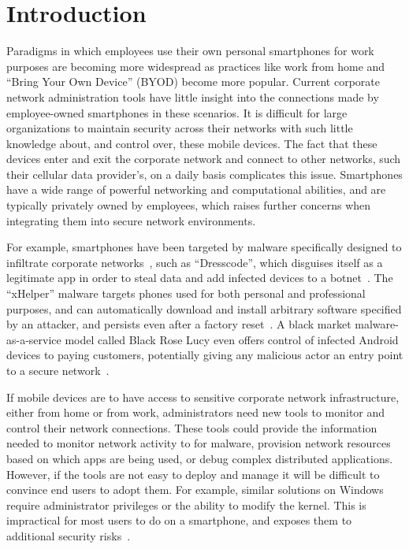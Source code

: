 \section{Introduction}
\label{sec:introduction}


Paradigms in which employees use their own personal smartphones for work
purposes are becoming more widespread as practices like work from home and
``Bring Your Own Device'' (BYOD) become more popular. Current corporate network
administration tools have little insight into the connections made by
employee-owned smartphones in these scenarios. It is difficult for large
organizations to maintain security across their networks with such little
knowledge about, and control over, these mobile devices. The fact that these
devices enter and exit the corporate network and connect to other networks, such
their cellular data provider's, on a daily basis complicates this issue.
Smartphones have a wide range of powerful networking and computational
abilities, and are typically privately owned by employees, which raises further
concerns when integrating them into secure network environments.

For example, smartphones have been targeted by malware specifically designed to
infiltrate corporate networks~\cite{kan2016}, such as ``Dresscode'', which
disguises itself as a legitimate app in order to steal data and add infected
devices to a botnet~\cite{palmer2016}. The ``xHelper'' malware targets phones
used for both personal and professional purposes, and can automatically download
and install arbitrary software specified by an attacker, and persists even after
a factory reset~\cite{vijayan2020}. A black market malware-as-a-service model
called Black Rose Lucy even offers control of infected Android devices to paying
customers, potentially giving any malicious actor an entry point to a secure
network~\cite{wong2018}.

If mobile devices are to have access to sensitive corporate network
infrastructure, either from home or from work, administrators need new tools to
monitor and control their network connections. These tools could provide the
information needed to monitor network activity to for malware, provision network
resources based on which apps are being used, or debug complex distributed
applications. However, if the tools are not easy to deploy and manage it will be
difficult to convince end users to adopt them.  For example, similar solutions
on Windows~\cite{chuluundorj2019, kwon2011} require administrator privileges or
the ability to modify the kernel. This is impractical for most users to do on a
smartphone, and exposes them to additional security risks~\cite{google2020}.

